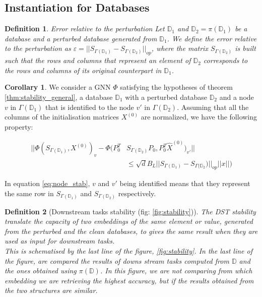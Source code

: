 \documentclass[11pt,a4paper]{article}
\newcommand{\op}[1]{|| #1 ||_{op}}
\newtheorem{definition}{Definition}
\theoremstyle{definition}
\newtheorem{corollary}{Corollary}[theorem]
\renewcommand{\leq}{\leqslant}
\begin{document}
    \subsection{Instantiation for Databases}
     
    \begin{definition}{Error relative to the perturbation}
        Let $\mathbb{D}_1$ and $ \mathbb{D}_2 = \pi(\mathbb{D}_1)$ be a database and a perturbed database generated from $\mathbb{D}_1$. We define the error relative to the perturbation as $\varepsilon =  \op{ S_{\Gamma(\mathbb{D}_1)} - S_{\Gamma(\mathbb{D}_2)} }$, where the matrix $S_{\Gamma(\mathbb{D}_2)}$ is built such that the rows and columns that represent an element of $\mathbb{D}_2$ corresponds to the rows and columns of its original counterpart in $\mathbb{D}_1$.
    \end{definition}


    \begin{corollary}
    
    We consider a GNN $\Phi$ satisfying the hypotheses of theorem \ref{thm:stability_general}, a database $\mathbb{D}_1$ with a perturbed database $\mathbb{D}_2$ and a node $v$ in $\Gamma(\mathbb{D}_1)$ that is identified to the node $v'$ in  $\Gamma(\mathbb{D}_2)$. Assuming that all the columns of the initialisation matrices $X^{(0)}$ are normalized, we have the following property:
    
    \begin{align}
        || \Phi(S_{\Gamma(\mathbb{D}_1)}, X^{(0)})_v - \Phi(P_0^T &S_{\Gamma(\mathbb{D}_2)} P_0, P_0^T \hat{X}^{(0)})_{v'}|| \\
        &\leq \sqrt{d} B_L \op{S_{\Gamma(\mathbb{D}_1)} - S_{\Gamma(\mathbb{D}_2})} ||x||)
    \end{align}

    In equation \ref{eq:node_stab},  $v$ and $v'$ being identified means that they represent the same row in $S_{\Gamma (\mathbb{D}_1)}$ and $S_{\Gamma(\mathbb{D}_2)}$ respectively. 
    \end{corollary}

\begin{definition}[Downstream tasks stability (fig: \ref{fig:stability})]
    The DST stability translate the capacity of two embeddings of the same element or value, generated from the perturbed and the clean databases, to gives the same result when they are used as input for downstream tasks.\\

    This is schematised by the last line of the figure, \ref{fig:stability}. In the last line of the figure, are compared the results of downs stream tasks computed from $\mathbb{D}$ and the ones obtained using $\pi (\mathbb{D})$. In this figure, we are not comparing from which embedding we are retrieving the highest accuracy, but if the results obtained from the two structures are similar. 
\end{definition}

\end{document}
